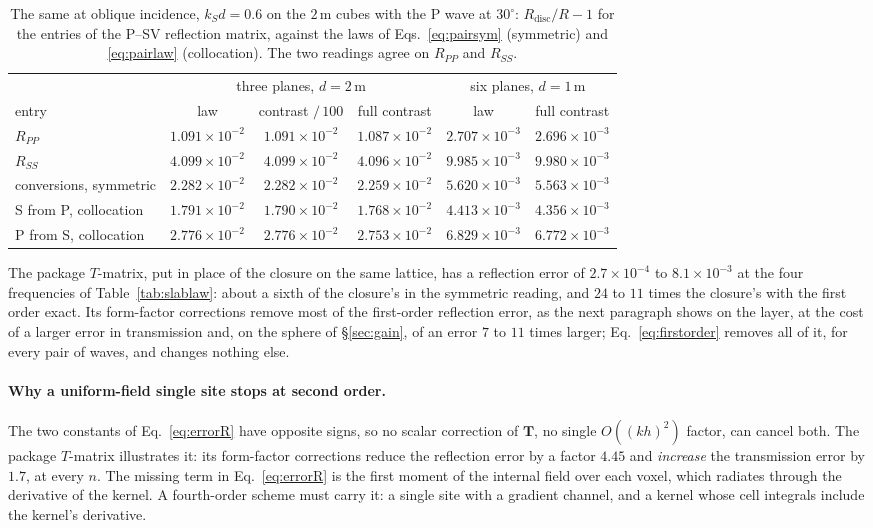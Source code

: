 \documentclass[11pt,a4paper]{article}
\newcommand{\bT}{\mathbf{T}}
\begin{document}
\begin{table}[htbp]
\centering
\caption{The same at oblique incidence, $k_Sd=0.6$ on the $2$\,m cubes with the P wave at $30^\circ$:
$R_{\text{disc}}/R-1$ for the entries of the P--SV reflection matrix, against the laws of
Eqs.~\eqref{eq:pairsym} (symmetric) and \eqref{eq:pairlaw} (collocation). The two readings agree on
$R_{PP}$ and $R_{SS}$.}\label{tab:slaboblique}
\small\setlength{\tabcolsep}{4pt}
\begin{tabular}{@{}lccccc@{}}
\toprule
 & \multicolumn{3}{c}{three planes, $d=2$\,m} & \multicolumn{2}{c}{six planes, $d=1$\,m} \\
entry & law & contrast $/\,100$ & full contrast & law & full contrast \\
\midrule
$R_{PP}$ & $1.091\times10^{-2}$ & $1.091\times10^{-2}$ & $1.087\times10^{-2}$ & $2.707\times10^{-3}$ & $2.696\times10^{-3}$ \\
$R_{SS}$ & $4.099\times10^{-2}$ & $4.099\times10^{-2}$ & $4.096\times10^{-2}$ & $9.985\times10^{-3}$ & $9.980\times10^{-3}$ \\
conversions, symmetric & $2.282\times10^{-2}$ & $2.282\times10^{-2}$ & $2.259\times10^{-2}$ & $5.620\times10^{-3}$ & $5.563\times10^{-3}$ \\
S from P, collocation & $1.791\times10^{-2}$ & $1.790\times10^{-2}$ & $1.768\times10^{-2}$ & $4.413\times10^{-3}$ & $4.356\times10^{-3}$ \\
P from S, collocation & $2.776\times10^{-2}$ & $2.776\times10^{-2}$ & $2.753\times10^{-2}$ & $6.829\times10^{-3}$ & $6.772\times10^{-3}$ \\
\bottomrule
\end{tabular}
\end{table}

The package $T$-matrix, put in place of the closure on the same lattice, has a reflection error of
$2.7\times10^{-4}$ to $8.1\times10^{-3}$ at the four frequencies of Table~\ref{tab:slablaw}: about a sixth
of the closure's in the symmetric reading, and $24$ to $11$ times the closure's with the first order
exact. Its form-factor corrections remove most of the first-order reflection error, as the next paragraph
shows on the layer, at the cost of a larger error in transmission and, on the sphere of
\S\ref{sec:gain}, of an error $7$ to $11$ times larger; Eq.~\eqref{eq:firstorder} removes all of it, for
every pair of waves, and changes nothing else.

\paragraph{Why a uniform-field single site stops at second order.} The two constants of Eq.~\eqref{eq:errorR} have opposite
signs, so no scalar correction of $\bT$, no single $O((kh)^2)$ factor, can cancel both. The
package $T$-matrix illustrates it: its form-factor corrections reduce the reflection error by a
factor $4.45$ and \emph{increase} the transmission error by $1.7$, at every $n$. The missing term in
Eq.~\eqref{eq:errorR} is the first moment of the internal field over each voxel, which radiates
through the derivative of the kernel. A fourth-order scheme must carry it: a single site with a
gradient channel, and a kernel whose cell integrals include the kernel's derivative.
\end{document}
